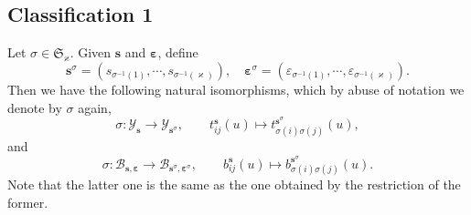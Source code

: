 \documentclass[11pt,reqno]{amsart}
\numberwithin{equation}{section}
\newtheorem{lem}[thm]{Lemma}
\theoremstyle{definition}
\theoremstyle{remark}
\newcommand{\beq}{\begin{equation}}
\newcommand{\eeq}{\end{equation}}
\newcommand{\gl}{\mathfrak{gl}}
\newcommand{\bC}{\mathbb{C}}
\newcommand{\tl}{\tilde}
\newcommand{\la}{\lambda}
\newcommand{\YMN}{{\mathscr{Y}_{\bm s}}}
\newcommand{\BMN}{{\mathscr{B}_{\bm s,\bm \ve}}}
\newcommand{\BME}{{\mathscr{B}_{m,\bm \ve}}}
\newcommand{\ka}{\varkappa}
\newcommand{\ve}{\varepsilon}
\newcommand{\s}{{\bm s}}
\begin{document}


\subsection{Classification 1}
Let $\sigma\in \mathfrak S_{\ka}$. Given $\s$ and $\bm\ve$,
define
\[
\s^{\sigma}=(s_{\sigma^{-1}(1)},\cdots,s_{\sigma^{-1}(\ka)}), \quad \bm\ve^{\sigma}=(\ve_{\sigma^{-1}(1)},\cdots,\ve_{\sigma^{-1}(\ka)}).
\]
Then we have the following natural isomorphisms, which by abuse of notation we denote by $\sigma$ again,
\beq\label{sigmaY}
\sigma:\YMN\to \mathscr Y_{\s^\sigma},\qquad  t_{ij}^\s(u)\mapsto t_{\sigma(i)\sigma(j)}^{\s^\sigma}(u),
\eeq
and
\beq\label{sigmaB}
\sigma:\BMN\to \mathscr B_{\s^\sigma,\bm \ve^\sigma},\qquad b_{ij}^\s(u)\mapsto b_{\sigma(i)\sigma(j)}^{\s^\sigma}(u).
\eeq
Note that the latter one is the same as the one obtained by the restriction of the former.
\end{document}
